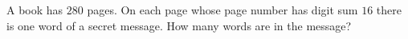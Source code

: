 A book has $280$ pages. On each page whose page number has digit sum $16$ there is one word of a secret message. How many words are in the message?
